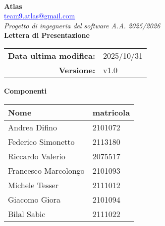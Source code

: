 \documentclass[a4paper,12pt]{article}
\makeatletter
\newcommand{\Gruppo}{Atlas}
\newcommand{\Email}{\href{mailto:team9.atlas@gmail.com}{\textcolor{blue}{\underline{team9.atlas@gmail.com}}}}
\newcommand{\TitoloUno}{Lettera di Presentazione}
\newcommand{\DataModifica}{2025/10/31}
\newcommand{\LogoGruppo}{img/AtlasLogo.png} %
\newcommand{\VersioneDocumento}{v1.0} %
\makeatother
\begin{document}
\begin{titlepage}
    \centering

    \vspace*{0cm}
    \\[0.8cm]

    {\LARGE \textbf{\Gruppo}}\\[0.1cm]
    {\large \Email}\\[1.2cm]

    {\Large \textit{Progetto di ingegneria del software A.A. 2025/2026}}\\[1.5cm]

    {\Huge \textbf{\TitoloUno}}\\[.5cm]

    \begin{tabular}{rl}
        \textbf{Data ultima modifica:} & \DataModifica \\
        \textbf{Versione:} & \VersioneDocumento \\
    \end{tabular}

    \hspace{1cm}

     {\large \textbf{Componenti}}\\[0.5cm]
    \begin{tabular}{l|l}
        \textbf{Nome} & \textbf{matricola} \\
        \hline
        Andrea Difino & 2101072 \\
        Federico Simonetto & 2113180 \\
        Riccardo Valerio & 2075517 \\
        Francesco Marcolongo & 2101093 \\
        Michele Tesser & 2111012 \\
        Giacomo Giora & 2101094 \\
        Bilal Sabic & 2111022 \\
    \end{tabular}

\end{titlepage}
\end{document}
